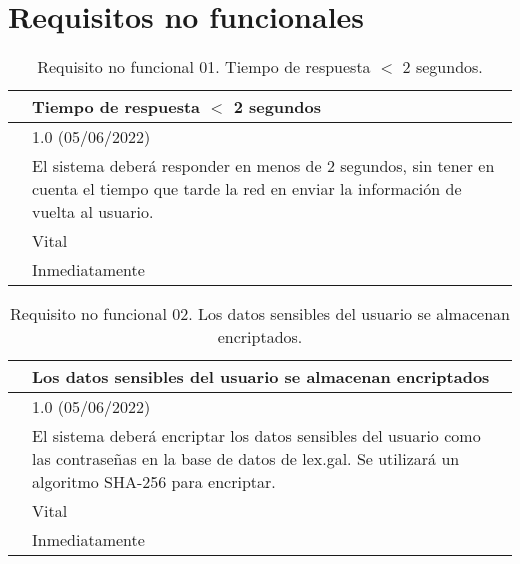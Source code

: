 \section{Requisitos no funcionales}
\label{APRequisitosNoFuncionales}

\begin{table}[H]
\begin{center}
\begin{tabular}{|p{3cm}|p{10cm}|} \hline
\centering {\bf NFR-01} & Tiempo de respuesta $<$ 2 segundos  \\ \hline\hline
\centering {\bf Versión} & 1.0 (05/06/2022) \\ \hline
\centering {\bf Descripción} & El sistema deberá responder en menos de 2 segundos, sin tener en cuenta el tiempo que tarde la red en enviar la información de vuelta al usuario. \\ \hline
\centering {\bf Importancia} & Vital \\ \hline
\centering {\bf Urgencia} & Inmediatamente \\ \hline
\end{tabular}
\caption{Requisito no funcional 01. Tiempo de respuesta $<$ 2 segundos.}
\label{enlaceNFR1}
\end{center}
\end{table}

\begin{table}[H]
\begin{center}
\begin{tabular}{|p{3cm}|p{10cm}|} \hline
\centering {\bf NFR-02} & Los datos sensibles del usuario se almacenan encriptados  \\ \hline\hline
\centering {\bf Versión} & 1.0 (05/06/2022) \\ \hline
\centering {\bf Descripción} & El sistema deberá encriptar los datos sensibles del usuario como las contraseñas en la base de datos de lex.gal. Se utilizará un algoritmo SHA-256 para encriptar. \\ \hline
\centering {\bf Importancia} & Vital \\ \hline
\centering {\bf Urgencia} & Inmediatamente \\ \hline
\end{tabular}
\caption{Requisito no funcional 02. Los datos sensibles del usuario se almacenan encriptados.}
\label{enlaceNFR2}
\end{center}
\end{table}

